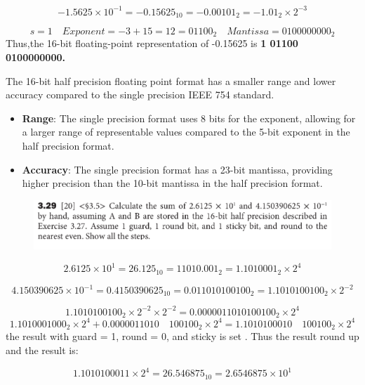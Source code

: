 \documentclass[cn,12pt]{homework}
\begin{document}
\begin{solution}
  \quad

\[
-1.5625 \times 10^{-1} = -0.15625_{10} = -0.00101_2=-1.01_2 \times 2^{-3}
\]

\[
  s=1\quad Exponent=-3+15=12=01100_2 \quad Mantissa=0100000000_2
\]
Thus,the 16-bit floating-point representation of -0.15625 is \textbf{\large 1 01100 0100000000.}

The 16-bit half precision floating point format has a smaller range and lower accuracy compared to the single precision IEEE 754 standard.

\begin{itemize}
  \item \textbf{Range}: The single precision format uses 8 bits for the exponent, allowing for a larger range of representable values compared to the 5-bit exponent in the half precision format.
  \item \textbf{Accuracy}: The single precision format has a 23-bit mantissa, providing higher precision than the 10-bit mantissa in the half precision format.
\end{itemize}
\end{solution}
\newpage



\begin{problem}
  \quad
  \begin{figure}[H]
    \centering
    \includegraphics[width=1\textwidth]{./figures/image3.png}
    \label{fig:pro1}
  \end{figure}

\end{problem}



\begin{solution}
  \quad
\[
2.6125 \times 10^1 = 26.125_{10} = 11010.001_2=1.1010001_2 \times 2^4
\]

\[
4.150390625 \times 10^{-1} = 0.4150390625_{10} = 0.011010100100_2=1.1010100100_2 \times 2^{-2}
\]

\[
1.1010100100_2 \times 2^{-2} \times 2^{-2} = 0.0000011010100100_2 \times 2^4
\]
\[
    1.1010001000_2 \times 2^4
  + 0.0000011010 \quad 100100_2 \times 2^4
  = 1.1010100010 \quad 100100_2 \times 2^4
\]
the result with guard = 1, round = 0, and sticky is set .
Thus the result round up  and the result is:

\[
1.1010100011 \times 2^4  = 26.546875_{10} =2.6546875 \times 10^1
\]
\end{solution}
\newpage
\end{document}
